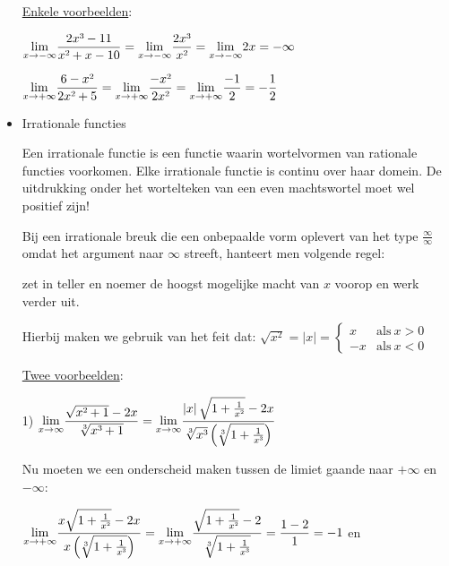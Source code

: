 \begin{itemize}
\uline{Enkele voorbeelden}:

${\displaystyle \lim_{x\to-\infty}}{\displaystyle \frac{2x\text{\textthreesuperior}-11}{x\text{\texttwosuperior}+x-10}}={\displaystyle \lim_{x\to-\infty}}{\displaystyle \frac{2x\text{\textthreesuperior}}{x\text{\texttwosuperior}}}={\displaystyle \lim_{x\to-\infty}}2x=-\infty$

${\displaystyle \lim_{x\to+\infty}}{\displaystyle \frac{6-x\text{\texttwosuperior}}{2x\text{\texttwosuperior}+5}}={\displaystyle \lim_{x\to+\infty}}{\displaystyle \frac{-x\text{\texttwosuperior}}{2x\text{\texttwosuperior}}}={\displaystyle \lim_{x\to+\infty}}{\displaystyle \frac{-1}{2}}={\displaystyle -\frac{1}{2}}$





\item{Irrationale functies}

Een irrationale functie is een functie waarin wortelvormen van rationale
functies voorkomen. Elke irrationale functie is continu over haar
domein. De uitdrukking onder het wortelteken van een even machtswortel
moet wel positief zijn!

Bij een irrationale breuk die een onbepaalde vorm oplevert
van het type $\frac{\infty}{\infty}$ omdat het argument naar $\infty$
streeft, hanteert men volgende regel:

zet in teller en noemer de hoogst mogelijke macht van $x$ voorop
en werk verder uit.

Hierbij maken we gebruik van het feit dat: $\sqrt{x^{2}}=\left|x\right|=\begin{cases}
x & \mathrm{als}\:x>0\\
-x & \mathrm{als}\:x<0
\end{cases}$


\uline{Twee voorbeelden}:


1) ${\displaystyle {\displaystyle \lim_{x\to\infty}}\frac{\sqrt{x\text{\texttwosuperior}+1}-2x}{\sqrt[3]{x\text{\textthreesuperior}+1}}={\displaystyle \lim_{x\to\infty}}\frac{\left|x\right|\sqrt{1+\frac{1}{x\text{\texttwosuperior}}}-2x}{\sqrt[3]{x\text{\textthreesuperior}}\left(\sqrt[3]{1+\frac{1}{x\text{\textthreesuperior}}}\right)}}$

Nu moeten we een onderscheid maken tussen de limiet gaande naar $+\infty$
en $-\infty$:

	${\displaystyle {\displaystyle \lim_{x\to+\infty}}\frac{x\sqrt{1+\frac{1}{x\text{\texttwosuperior}}}-2x}{x\left(\sqrt[3]{1+\frac{1}{x\text{\textthreesuperior}}}\right)}={\displaystyle \lim_{x\to+\infty}}\frac{\sqrt{1+\frac{1}{x\text{\texttwosuperior}}}-2}{\sqrt[3]{1+\frac{1}{x\text{\textthreesuperior}}}}=\frac{1-2}{1}=-1}$
	en
	

\end{itemize}
